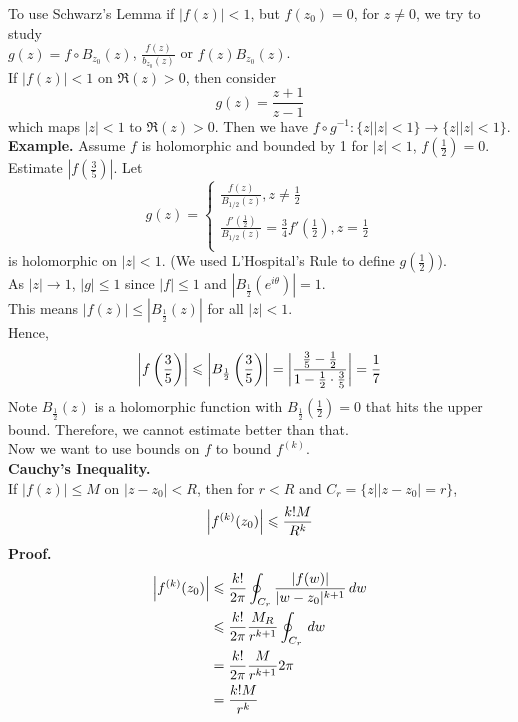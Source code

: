 \documentclass[11pt]{article}
\DeclarePairedDelimiter\abs{\lvert}{\rvert}
\begin{document}
To use Schwarz's Lemma if $|f(z)| < 1$, but $f(z_0) = 0$, for $z \neq 0$, we try to study \\
$g(z) = f \circ B_{z_0}(z)$, $\frac{f(z)}{b_{z_0}(z)}$ or $f(z)B_{z_0}(z)$.\\
If $|f(z)| < 1$ on $\Re(z) > 0$, then consider 
$$g(z) = \frac{z + 1}{z - 1}$$
which maps $|z| < 1$ to $\Re(z) > 0$. Then we have $f \circ g^{-1}: \{z| |z| < 1\} \to \{z| |z| < 1\}$.\\
\newline
\textbf{Example.} Assume $f$ is holomorphic and bounded by 1 for $|z| < 1$, $f(\frac{1}{2}) = 0$. Estimate $|f(\frac{3}{5})|$.
Let 
\[ 
g(z) = 
\begin{cases} 
	\frac{f(z)}{B_{1/2}(z)}, z \neq \frac{1}{2} \\
	\frac{f'(\frac{1}{2})}{B_{1/2}(z)} = \frac{3}{4}f'(\frac{1}{2}), z = \frac{1}{2}\\
   \end{cases}
\]
is holomorphic on $|z| < 1$. (We used L'Hospital's Rule to define $g(\frac{1}{2})$). \\
As $|z| \to 1$, $|g| \leqslant 1$ since $|f| \leqslant 1 $ and $|B_{\frac{1}{2}}(e^{i\theta})| = 1$. \\
This means $|f(z)| \leqslant |B_{\frac{1}{2}}(z)|$ for all $|z| < 1$. \\
Hence, 
$$\abs*{f\left(\frac{3}{5}\right)} \leqslant \abs*{B_{\frac{1}{2}}\left(\frac{3}{5}\right)} = \abs*{\frac{\frac{3}{5} - \frac{1}{2}}{1 - \frac{1}{2}\cdot \frac{3}{5}}} = \frac{1}{7}$$
Note $B_{\frac{1}{2}}(z)$ is a holomorphic function with $B_{\frac{1}{2}}(\frac{1}{2}) = 0$ that hits the upper bound. Therefore, we cannot estimate better than that. \\
\newline
Now we want to use bounds on $f$ to bound $f^{(k)}$. \\
\newline
\textbf{Cauchy's Inequality.} \\
If $|f(z)| \leqslant M$ on $|z - z_0| < R$, then for $r < R$ and $C_r = \{z||z - z_0| = r\}$, 
$$\abs*{f^{(k)}(z_0)} \leqslant \frac{k!M}{R^k}$$
\textbf{Proof.}
\begin{align*}
\abs*{f^{(k)}(z_0)} &\leqslant \frac{k!}{2\pi} \oint_{C_r} \frac{|f(w)|}{|w-z_0|^{k + 1}} \, dw \\
&\leqslant \frac{k!}{2\pi}\frac{M_R}{r^{k + 1}} \oint_{C_r} \,dw\\
&=\frac{k!}{2\pi}\frac{M}{r^{k + 1}}2\pi \\
&=\frac{k!M}{r^k}
\end{align*}
\end{document}

